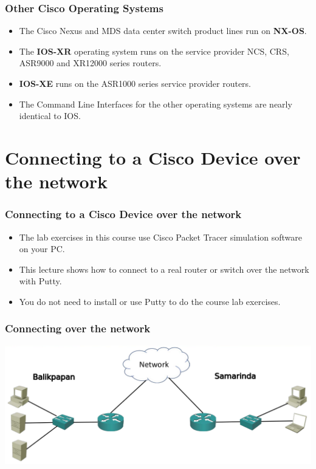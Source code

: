 \documentclass[pdflatex,compress]{beamer}
\begin{document}
\begin{frame}
	\frametitle{Other Cisco Operating Systems}
	\begin{itemize}
		\item The Cisco Nexus and MDS data center switch product lines run on \textbf{NX-OS}.
		\item The \textbf{IOS-XR} operating system runs on the service provider NCS, CRS, ASR9000 and XR12000 series routers.
		\item \textbf{IOS-XE} runs on the ASR1000 series service provider routers.
		\item The Command Line Interfaces for the other operating systems are nearly identical to IOS.
	\end{itemize}
\end{frame}


\section{Connecting to a Cisco Device over the network}

\begin{frame}
	\frametitle{Connecting to a Cisco Device over the network}
	\begin{itemize}
		\item The lab exercises in this course use Cisco Packet Tracer simulation software on your PC.
		\item This lecture shows how to connect to a real router or switch over the network with Putty.
		\item You do not need to install or use Putty to do the course lab exercises.
	\end{itemize}
\end{frame}

\begin{frame}
	\frametitle{Connecting over the network}
	\begin{center}
		\includegraphics[width=1\linewidth]{img/img01}
	\end{center}
\end{frame}
\end{document}
